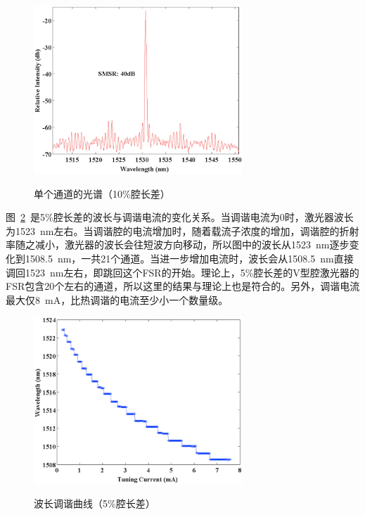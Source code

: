 \documentclass{ZJUthesis}
\begin{document}
\begin{figure}[htbp]
  \centering
  \includegraphics[width=0.7\textwidth]{./Pictures/double_spectrum_p10.eps}\\
  \caption{单个通道的光谱（10\%腔长差）}
  \label{fig_double_spectrum_p10}
\end{figure}

图~\ref{fig_double_tuning_p5}~是5\%腔长差的波长与调谐电流的变化关系。当调谐电流为0时，激光器波长为1523~nm左右。当调谐腔的电流增加时，随着载流子浓度的增加，调谐腔的折射率随之减小，激光器的波长会往短波方向移动，所以图中的波长从1523~nm逐步变化到1508.5~nm，一共21个通道。当进一步增加电流时，波长会从1508.5~nm直接调回1523~nm左右，即跳回这个FSR的开始。理论上，5\%腔长差的V型腔激光器的FSR包含20个左右的通道，所以这里的结果与理论上也是符合的。另外，调谐电流最大仅8~mA，比热调谐的电流至少小一个数量级。

\begin{figure}[htbp]
  \centering
  \includegraphics[width=0.7\textwidth]{./Pictures/double_tuning_p5.eps}\\
  \caption{波长调谐曲线（5\%腔长差）}
  \label{fig_double_tuning_p5}
\end{figure}
\end{document}
